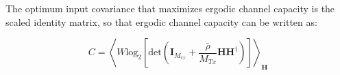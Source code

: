 \documentclass[fleqn]{article}
\begin{document}
\begin{enumerate}
		The optimum input covariance that maximizes ergodic channel capacity is the scaled identity matrix, so that ergodic channel capacity can be written as:
		
		\begin{equation*}
			C = \left\langle W \text{log}_2\left[\text{det}\left(\mathbf{I}_{M_{rx}} + \frac{\bar{\rho}}{M_{Tx}}\mathbf{HH^{\dagger}}\right)\right]\right\rangle_{\mathbf{H}}
		\end{equation*}
		
%		
%		
%		
%		
%		
%		
%		
%		
		
%			
		

\end{enumerate}
\end{document}
